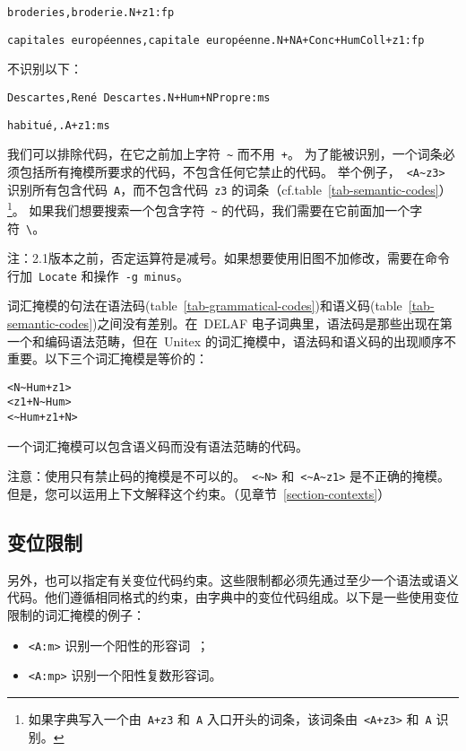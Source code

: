 \bigskip
\noindent
\texttt{broderies,broderie.N+z1:fp}

\noindent
\texttt{capitales europ\'eennes,capitale europ\'eenne.N+NA+Conc+HumColl+z1:fp}

\bigskip
\noindent 不识别以下：

\bigskip
\noindent
\texttt{Descartes,Ren\'e Descartes.N+Hum+NPropre:ms}

\noindent
\texttt{habitu\'e,.A+z1:ms}

\bigskip
\noindent  我们可以排除代码，在它之前加上字符\ \verb+~+ 而不用\ \verb$+$。\index{\verb+~+}
为了能被识别，一个词条必须包括所有掩模所要求的代码，不包含任何它禁止的代码。 举个例子，\ \verb$<A~z3>$ 识别所有包含代码\ \verb+A+，而不包含代码\ \verb+z3+ 的词条（cf.table~\ref{tab-semantic-codes}）
\footnote{如果字典写入一个由\ \texttt{A+z3} 和\ \texttt{A} 入口开头的词条，该词条由\ \texttt{<A+z3>} 和\ \texttt{A} 识别。}。
如果我们想要搜索一个包含字符\ \verb$~$ 的代码，我们需要在它前面加一个字符\ \verb+\+。

\bigskip
\noindent 注：2.1版本之前，否定运算符是减号。如果想要使用旧图不加修改，需要在命令行加\ \verb+Locate+ 和操作\ \verb+-g minus+。

\bigskip
\noindent  词汇掩模的句法在语法码(table~\ref{tab-grammatical-codes})和语义码(table~\ref{tab-semantic-codes})之间没有差别。在\ DELAF 电子词典里，语法码是那些出现在第一个和编码语法范畴，但在\ Unitex 的词汇掩模中，语法码和语义码的出现顺序不重要。以下三个词汇掩模是等价的：

\begin{verbatim}
<N~Hum+z1>
<z1+N~Hum>
<~Hum+z1+N>
\end{verbatim}

\noindent 一个词汇掩模可以包含语义码而没有语法范畴的代码。

\bigskip
\noindent 注意：使用只有禁止码的掩模是不可以的。\ \verb+<~N>+ 和\ \verb+<~A~z1>+ 是不正确的掩模。但是，您可以运用上下文解释这个约束。（见章节~\ref{section-contexts}）


\subsection{变位限制}
另外，也可以指定有关变位代码约束。这些限制都必须先通过至少一个语法或语义代码。他们遵循相同格式的约束，由字典中的变位代码组成。以下是一些使用变位限制的词汇掩模的例子：


\begin{itemize}
  \item \verb+<A:m>+ 识别一个阳性的形容词~；
  \item \verb+<A:mp>+ 识别一个阳性复数形容词。
\end{itemize}

